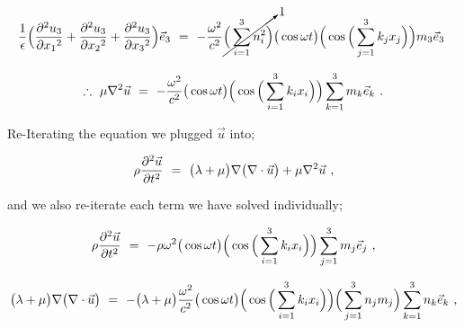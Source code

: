 \documentclass{article}
\begin{document}
\begin{equation} \label{eq:1}
\frac{1}{\epsilon} \Big( \frac{\partial{}^2 u_3}{\partial{x_1}^2} + \frac{\partial{}^2 u_3}{\partial{x_2}^2} + \frac{\partial{}^2 u_3}{\partial{x_3}^2} \Big) \vec{e}_3 \hspace{0.125cm} = \hspace{0.125cm} - \frac{\omega{}^2}{c^2} \cancelto{1}{\Big( \sum_{i = 1}^{3} n_{i}^{2} \Big)} \big( \cos{ \omega t } \big) \Big( \cos \Big( \sum_{j = 1}^{3} k_j x_j \Big) \Big) m_3 \vec{e}_3 \hspace{0.125cm} 
\end{equation}

\begin{equation} \label{eq:1}
\therefore \hspace{0.125cm} \mu \nabla{}^2 \vec{u} \hspace{0.125cm} = \hspace{0.125cm} - \frac{\omega{}^2}{c^2} \big( \cos{ \omega t } \big) \Big( \cos \Big( \sum_{i = 1}^{3} k_i x_i \Big) \Big) \sum_{k = 1}^{3} m_k \vec{e}_k \hspace{0.125cm}  .
\end{equation}

Re-Iterating the equation we plugged \begin{math} \vec{u} \end{math} into;

\begin{equation} \label{eq:1}
\rho \frac{\partial{}^2 \vec{u}}{\partial{ t }^2} \hspace{0.125cm} = \hspace{0.125cm} \big( \lambda + \mu \big) \nabla \big( \nabla \cdot \vec{u} \big) + \mu \nabla{}^2 \vec{u} \hspace{0.125cm}  , 
\end{equation}

and we also re-iterate each term we have solved individually;

\begin{equation} \label{eq:1}
\rho \frac{\partial{}^2 \vec{u}}{\partial{ t }^2} \hspace{0.125cm} = \hspace{0.125cm} - \rho \omega{}^2 \big( \cos{ \omega t } \big) \Big( \cos \Big( \sum_{i = 1}^{3} k_i x_i \Big) \Big) \sum_{j = 1}^{3} m_j \vec{e}_j \hspace{0.125cm} ,
\end{equation}

\begin{equation} \label{eq:1}
\big( \lambda + \mu \big) \nabla \big( \nabla \cdot \vec{u} \big) \hspace{0.125cm} = \hspace{0.125cm} - \big( \lambda + \mu \big)  \frac{\omega{}^2}{c^2} \big( \cos{ \omega t } \big) \Big( \cos \Big( \sum_{i = 1}^{3} k_i x_i \Big) \Big) \Big( \sum_{j = 1}^{3} n_j m_j \Big) \sum_{k = 1}^{3} n_k \vec{e}_k \hspace{0.125cm} , 
\end{equation}
\end{document}
